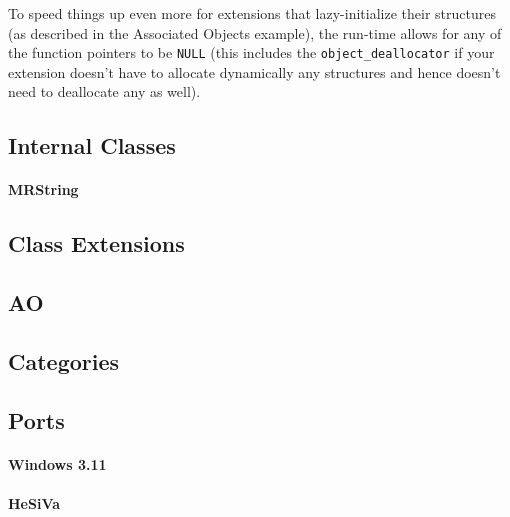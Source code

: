 To speed things up even more for extensions that lazy-initialize their structures (as described in the Associated Objects example), the run-time allows for any of the function pointers to be \verb=NULL= (this includes the \verb=object_deallocator= if your extension doesn't have to allocate dynamically any structures and hence doesn't need to deallocate any as well).

\subsection{Internal Classes}
\paragraph{MRString}

\subsection{Class Extensions}
\subsection{AO}
\subsection{Categories}

\subsection{Ports}
\paragraph{Windows 3.11}
\paragraph{HeSiVa}
